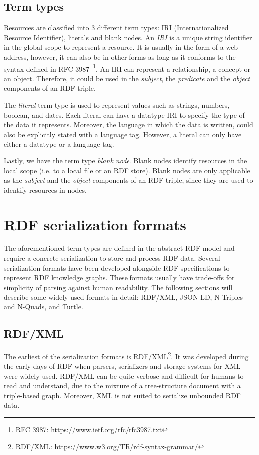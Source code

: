 \subsection{Term types}
Resources are classified into 3 different term types: IRI (Internationalized Resource Identifier),
literals and blank nodes. An \textit{IRI} is a unique string identifier in the global scope to
represent a resource. It is usually in the form of a web address, however, it can
also be in other forms as long as it conforms to the syntax defined in
RFC 3987~\footnote{RFC 3987: \url{https://www.ietf.org/rfc/rfc3987.txt}}.
An IRI can represent a relationship, a concept or an object. Therefore, it could be
used in the \textit{subject}, the \textit{predicate} and the \textit{object} components of
an RDF triple.

The \textit{literal} term type is used to represent values such as strings, numbers, boolean, and dates.
Each literal can have a datatype IRI to specify the type of the data it represents. Moreover, the
language in which the data is written, could also be explicitly stated with
a language tag. However, a literal can only have either a datatype or a language tag. 

Lastly, we have the term type \textit{blank node}. Blank nodes identify resources
in the local scope (i.e. to a local file or an RDF store).
Blank nodes are only applicable as the \textit{subject}
and the \textit{object} components of an RDF triple, since they are used to
identify resources in nodes.


\section{RDF serialization formats}

The aforementioned term types are defined in the abstract RDF model and 
require a concrete serialization to store and process RDF data. 
Several serialization formats have been developed alongside RDF specifications to represent RDF
knowledge graphs.
These formats usually have trade-offs for simplicity of parsing against 
human readability. The following sections will describe some widely used formats in detail: 
RDF/XML, JSON-LD, N-Triples and N-Quads, and Turtle. 


\subsection{RDF/XML}
The earliest of the serialization formats is RDF/XML\footnote{RDF/XML: \url{https://www.w3.org/TR/rdf-syntax-grammar/}}. 
It was developed during the early days of RDF when parsers, serializers and storage systems 
for XML were widely used. 
RDF/XML can be quite verbose and difficult for humans to read and understand, 
due to the mixture of a tree-structure document with a triple-based graph. 
Moreover, XML is not suited to serialize unbounded RDF data.



